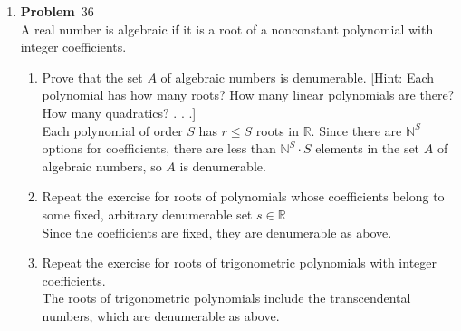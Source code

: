 \documentclass[12pt]{amsart}
\newcommand{\benu}{\begin{enumerate}}
\newcommand{\eenu}{\end{enumerate}}
\theoremstyle{definition}
\newcommand{\mbR}{\mathbb{R}}
\newcommand{\mbN}{\mathbb{N}}
\newcommand{\itep}{\item {\bfseries Problem}\ }
\begin{document}
\begin{enumerate}[series=p]
\newpage
\itep 36\\
A real number is algebraic if it is a root of a nonconstant polynomial with integer coefficients.
\benu
\item Prove that the set $A$ of algebraic numbers is denumerable.  [Hint: Each polynomial has how many roots?  How many linear polynomials are there?  How many quadratics? . . .]
\\
Each polynomial of order $S$ has $r \leq S$ roots in $\mbR$.  Since there are $\mbN^S$ options for coefficients, there are less than $\mbN^S \cdot S$ elements in the set $A$ of algebraic numbers, so $A$ is denumerable.
\\
\item Repeat the exercise for roots of polynomials whose coefficients belong to some fixed, arbitrary denumerable set $s \in \mbR$
\\
Since the coefficients are fixed, they are denumerable as above.
\\
\item Repeat the exercise for roots of trigonometric polynomials with integer coefficients.
\\
The roots of trigonometric polynomials include the transcendental numbers, which are denumerable as above.
\eenu

\end{enumerate}
\end{document}
